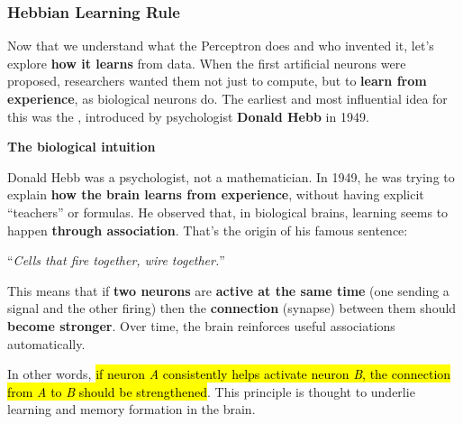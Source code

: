 \subsubsection{Hebbian Learning Rule}

Now that we understand what the Perceptron does and who invented it, let's explore \textbf{how it learns} from data. When the first artificial neurons were proposed, researchers wanted them not just to compute, but to \textbf{learn from experience}, as biological neurons do. The earliest and most influential idea for this was the , introduced by psychologist \textbf{Donald Hebb} in 1949.

\highspace
\begin{flushleft}
    \textcolor{Green3}{ \textbf{The biological intuition}}
\end{flushleft}
Donald Hebb was a psychologist, not a mathematician. In 1949, he was trying to explain \textbf{how the brain learns from experience}, without having explicit ``teachers'' or formulas. He observed that, in biological brains, learning seems to happen \textbf{through association}. That's the origin of his famous sentence:
\begin{center}
    ``\emph{Cells that fire together, wire together.}''
\end{center}
This means that if \textbf{two neurons} are \textbf{active at the same time} (one sending a signal and the other firing) then the \textbf{connection} (synapse) between them should \textbf{become stronger}. Over time, the brain reinforces useful associations automatically.

\highspace
In other words, \hl{if neuron \emph{A} consistently helps activate neuron \emph{B}, the connection from \emph{A} to \emph{B} should be strengthened}. This principle is thought to underlie learning and memory formation in the brain.

